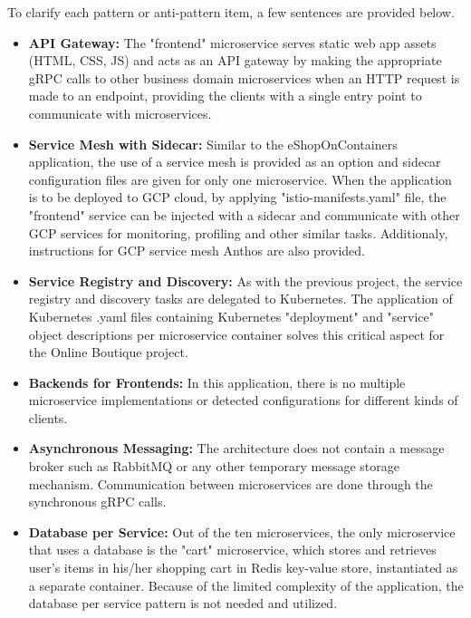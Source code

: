 \documentclass{Configuration_Files/PoliMi3i_thesis}
\begin{document}
To clarify each pattern or anti-pattern item, a few sentences are provided below.

\begin{itemize}
    \item \textbf{API Gateway:} The "frontend" microservice serves static web app assets (HTML, CSS, JS) and acts as an API gateway by making the appropriate gRPC calls to other business domain microservices when an HTTP request is made to an endpoint, providing the clients with a single entry point to communicate with microservices.
    
    \item \textbf{Service Mesh with Sidecar:} Similar to the eShopOnContainers application, the use of a service mesh is provided as an option and sidecar configuration files are given for only one microservice.
    When the application is to be deployed to GCP cloud, by applying "istio-manifests.yaml" file, the "frontend" service can be injected with a sidecar and communicate with other GCP services for monitoring, profiling and other similar tasks. 
    Additionaly, instructions for GCP service mesh Anthos\footnotemark[72] are also provided.
    
    \item \textbf{Service Registry and Discovery:} As with the previous project, the service registry and discovery tasks are delegated to Kubernetes.
    The application of Kubernetes .yaml files containing Kubernetes "deployment" and "service" object descriptions per microservice container solves this critical aspect for the Online Boutique project.
    
    \item \textbf{Backends for Frontends:} In this application, there is no multiple microservice implementations or detected configurations for different kinds of clients.
    
    \item \textbf{Asynchronous Messaging:} The architecture does not contain a message broker such as RabbitMQ or any other temporary message storage mechanism.
    Communication between microservices are done through the synchronous gRPC calls.
    
    \item \textbf{Database per Service:} Out of the ten microservices, the only microservice that uses a database is the "cart" microservice, which stores and retrieves user's items in his/her shopping cart in Redis key-value store, instantiated as a separate container.
    Because of the limited complexity of the application, the database per service pattern is not needed and utilized.
    

\end{itemize}
\end{document}
